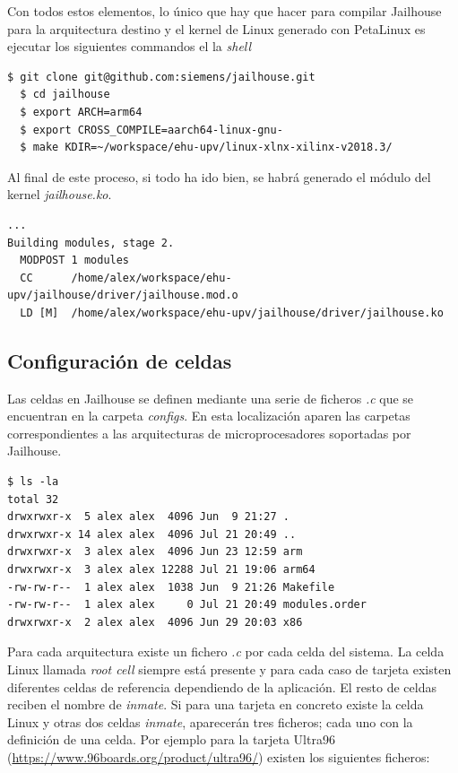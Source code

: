 Con todos estos elementos, lo único que hay que hacer para compilar Jailhouse para la arquitectura destino y el kernel de Linux generado con PetaLinux es ejecutar los siguientes commandos el la \textit{shell}

\begin{lstlisting}[style=CStyle]
  $ git clone git@github.com:siemens/jailhouse.git
  $ cd jailhouse
  $ export ARCH=arm64
  $ export CROSS_COMPILE=aarch64-linux-gnu-
  $ make KDIR=~/workspace/ehu-upv/linux-xlnx-xilinx-v2018.3/
\end{lstlisting}

Al final de este proceso, si todo ha ido bien, se habrá generado el módulo del kernel \textit{jailhouse.ko}.

\begin{lstlisting}[style=CStyle]
...
Building modules, stage 2.
  MODPOST 1 modules
  CC      /home/alex/workspace/ehu-upv/jailhouse/driver/jailhouse.mod.o
  LD [M]  /home/alex/workspace/ehu-upv/jailhouse/driver/jailhouse.ko
\end{lstlisting}

\subsection{Configuración de celdas}

Las celdas en Jailhouse se definen mediante una serie de ficheros \textit{.c} que se encuentran en la carpeta \textit{configs}. En esta localización aparen las carpetas correspondientes a las arquitecturas de microprocesadores soportadas por Jailhouse.

\begin{lstlisting}[style=CStyle]
$ ls -la
total 32
drwxrwxr-x  5 alex alex  4096 Jun  9 21:27 .
drwxrwxr-x 14 alex alex  4096 Jul 21 20:49 ..
drwxrwxr-x  3 alex alex  4096 Jun 23 12:59 arm
drwxrwxr-x  3 alex alex 12288 Jul 21 19:06 arm64
-rw-rw-r--  1 alex alex  1038 Jun  9 21:26 Makefile
-rw-rw-r--  1 alex alex     0 Jul 21 20:49 modules.order
drwxrwxr-x  2 alex alex  4096 Jun 29 20:03 x86
\end{lstlisting}

Para cada arquitectura existe un fichero \textit{.c} por cada celda del sistema. La celda Linux llamada \textit{root cell} siempre está presente y para cada caso de tarjeta existen diferentes celdas de referencia dependiendo de la aplicación. El resto de celdas reciben el nombre de \textit{inmate}. Si para una tarjeta en concreto existe la celda Linux y otras dos celdas \textit{inmate}, aparecerán tres ficheros; cada uno con la definición de una celda. Por ejemplo para la tarjeta Ultra96 (\url{https://www.96boards.org/product/ultra96/}) existen los siguientes ficheros:

